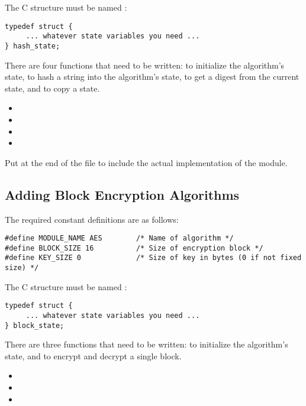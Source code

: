 \documentclass{howto}
\begin{document}
The C structure must be named :

\begin{verbatim}
typedef struct {
     ... whatever state variables you need ...
} hash_state;
\end{verbatim}

There are four functions that need to be written: to initialize the
algorithm's state, to hash a string into the algorithm's state, to get
a digest from the current state, and to copy a state.

\begin{itemize}
  \item {}
  \item {}
  \item {}
  \item {}
\end{itemize}

Put  at the end of the file to
include the actual implementation of the module.


\subsection{Adding Block Encryption Algorithms}

The required constant definitions are as follows:

\begin{verbatim}
#define MODULE_NAME AES	       /* Name of algorithm */
#define BLOCK_SIZE 16          /* Size of encryption block */
#define KEY_SIZE 0             /* Size of key in bytes (0 if not fixed size) */
\end{verbatim}

The C structure must be named :

\begin{verbatim}
typedef struct {
     ... whatever state variables you need ...
} block_state;
\end{verbatim}

There are three functions that need to be written: to initialize the
algorithm's state, and to encrypt and decrypt a single block.

\begin{itemize}
  \item {}
  \item {}
  \item {}
\end{itemize}
\end{document}

